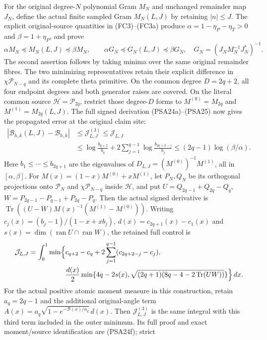 For the original degree-$N$ polynomial Gram $M_N$ and unchanged
remainder map $J_N$, define the actual finite sampled Gram
$M_N(L,J)$ by retaining $|n|\le J$. The explicit original-source
quantities in (FC3)--(FC3a) produce
$\alpha=1-\eta_P-\eta_T>0$ and $\beta=1+\eta_P$, and prove
\[
 \alpha M_N\preceq M_N(L,J)\preceq\beta M_N,\qquad
 \alpha G_N\preceq G_N(L,J)\preceq\beta G_N,
 \quad G_N=(J_NM_N^{-1}J_N^*)^{-1}.
\]
The second assertion follows by taking minima over the same original
remainder fibres. The two minimizing representatives retain their
explicit difference in $\chi\mathcal P_{N-q}$ and its complete
theta primitive. On the common degree $D=2q+2$, all four endpoint
degrees and both generator raises are covered. On the literal common source
$\mathcal H=\mathcal P_{2q}$, restrict those degree-$D$ forms to
$M^{(0)}=M_{2q}$ and $M^{(1)}=M_{2q}(L,J)$.
The full signed derivation (PSA24a)--(PSA25) now gives the
propagated error at the original claim site:
\[
 \begin{aligned}
 \left|\mathcal B_{h,k}(L,J)-\mathcal B_{h,k}\right|
 &\le\mathcal J^{(3)}_{L,J}\le\mathcal J_{L,J}\\
 &\le\log\frac{b_{q+2}}{b_q}
       +2\sum_{j=1}^{q-1}\log\frac{b_{2q+2-j}}{b_j}
 \le(2q-1)\log(\beta/\alpha).
 \end{aligned}
\]
Here $b_1\le\cdots\le b_{2q+1}$ are the eigenvalues of
$D_{L,J}=(M^{(0)})^{-1}M^{(1)}$, all in $[\alpha,\beta]$.
For $M(x)=(1-x)M^{(0)}+xM^{(1)}$, let $P_N,Q_N$ be its
orthogonal projections onto $\mathcal P_N$ and
$\chi\mathcal P_{N-q}$ inside $\mathcal H$, and put
$U=Q_{2q-1}+Q_{2q}-Q_q$,
$W=P_{2q-1}-P_{q-1}+P_{2q}-P_q$.
Then the actual signed derivative is
$\operatorname{Tr}((U-W)M(x)^{-1}(M^{(1)}-M^{(0)}))$.
Writing $c_j(x)=(b_j-1)/(1-x+xb_j)$,
$d(x)=c_{2q+1}(x)-c_1(x)$ and
$s(x)=\dim(\operatorname{ran}U\cap\operatorname{ran}W)$,
the retained full control is
\[
 \begin{aligned}
 \mathcal J_{L,J}
 =\int_0^1\min\Bigl\{&
 c_{q+2}-c_q+2\sum_{j=1}^{q-1}(c_{2q+2-j}-c_j),\\
 &\frac{d(x)}2
   \min\{4q-2s(x),\sqrt{(2q+1)(8q-4-2\operatorname{Tr}(UW))}\}
                         \Bigr\}\,dx.
 \end{aligned}
\]
For the actual positive atomic moment measure in this construction,
retain $a_q=2q-1$ and the additional original-angle term
$A(x)=a_q\sqrt{1-e^{-\mathcal B(x)/a_q}}\,d(x)$.
Then $\mathcal J^{(3)}_{L,J}$ is the same integral with this
third term included in the outer minimum. Its full proof and
exact moment/source identification are (PSA24f); strict
